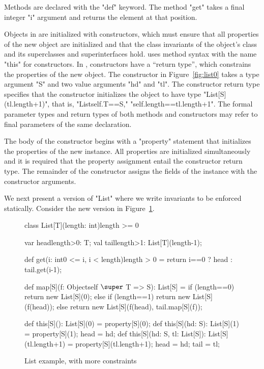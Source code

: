 Methods are declared with the \xcd"def" keyword.
The method \xcd"get" takes a final integer \xcd"i" argument
and returns the element at that position.

Objects in \Xten{} are initialized with constructors, which
must ensure that all properties of the new object
are initialized and that the class invariants of the object's
class and its superclasses and superinterfaces hold.
\Xten{} uses method syntax with the name
\xcd"this" for constructors.
In \Xten{}, constructors have a ``return type'', which constrains
the properties of the new object.  The constructor in
Figure~\ref{fig:list0} takes a type argument \xcd"S"
and two value arguments \xcd"hd" and \xcd"tl".  The constructor
return type specifies that the constructor initializes the
object to have type \xcd"List[S](tl.length+1)", that is,
\xcd"List{self.T==S," \xcd"self.length==tl.length+1}".
The formal parameter types and return types of both methods and
constructors may refer to final parameters of the same
declaration.

The body of the constructor
begins with a \xcd"property" statement that initializes the
properties of the new instance.  All properties are initialized
simultaneously and it is required that the property assignment
entail the constructor return type.
The remainder of the constructor assigns the fields of the
instance with the constructor arguments.

We next present a version of \xcd"List" where we write
invariants to be enforced statically.  Consider the new version
in Figure~\ref{fig:list}.

\begin{figure}
{\footnotesize
\begin{xtenmathnoindent}
class List[T](length: int){length >= 0} {
  var head{length>0}: T;
  val tail{length>1}: List[T](length-1);

  def get(i: int{0 <= i, i < length}){length > 0} = {
    return i==0 ? head : tail.get(i-1);
  }

  def map[S](f: Object{self $\super$ T} => S): List[S] = {
    if (length==0)
      return new List[S](0);
    else if (length==1)
      return new List[S](f(head));
    else
      return new List[S](f(head), tail.map[S](f));
  }

  def this[S](): List[S](0) = property[S](0);
  def this[S](hd: S): List[S](1) = {
    property[S](1); head = hd;
  }
  def this[S](hd: S, tl: List[S]): List[S](tl.length+1) = {
    property[S](tl.length+1);
    head = hd; tail = tl;
  }
}
\end{xtenmathnoindent}}
\caption{List example, with more constraints}
\label{fig:list}
\end{figure}

